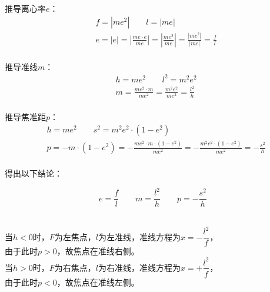 \documentclass[UTF8]{ctexart}
\begin{document}
    推导离心率$e$：
    \begin{align}
        &f=\left|me^2\right|\qquad l=|me|\\[3mm]
        &e=|e|=\left|\frac{me\cdot e}{me}\right|=\left|\frac{me^2}{me}\right|=\frac{\left|me^2\right|}{|me|}=\frac{f}{l}
    \end{align}\\
    推导准线$m$：
    \begin{align}
        &h=me^2\qquad l^2=m^2e^2\\[3mm]
        &m
        =\frac{me^2\cdot m}{me^2}
        =\frac{m^2e^2}{me^2}
        =\frac{l^2}{h}
    \end{align}\\
    推导焦准距$p$：
    \begin{align}
        &h=me^2\qquad s^2=m^2e^2\cdot\left(1-e^2\right)\\[3mm]
        &p
        =-m\cdot\left(1-e^2\right)
        =-\frac{me^2\cdot m\cdot\left(1-e^2\right)}{me^2}
        =-\frac{m^2e^2\cdot\left(1-e^2\right)}{me^2}
        =-\frac{s^2}{h}
    \end{align}\\
    得出以下结论：
    \begin{large}
        \begin{equation*}
            e=\frac{f}{l}\qquad m=\frac{l^2}{h}\qquad p=-\frac{s^2}{h}
        \end{equation*}
    \end{large}\\[1mm]
    当$h<0$时，$F$为左焦点，$l$为左准线，准线方程为$x=-\dfrac{l^2}{f}$，\\[1mm]
    由于此时$p>0$，故焦点在准线右侧。\\[3mm]
    当$h>0$时，$F$为右焦点，$l$为右准线，准线方程为$x=+\dfrac{l^2}{f}$，\\[1mm]
    由于此时$p<0$，故焦点在准线左侧。\vspace{6pt}
\end{document}
